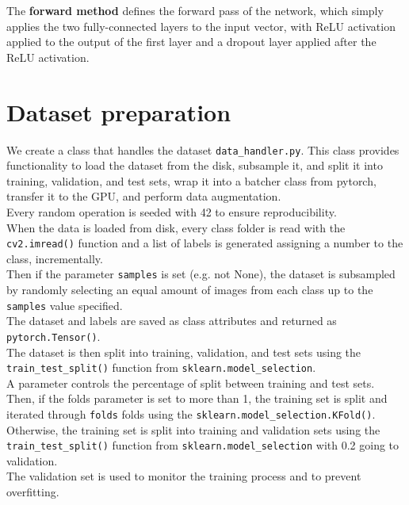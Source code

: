 \documentclass{report}
\begin{document}
    The \textbf{forward method} defines the forward pass of the network, which simply applies the two fully-connected layers to the input vector, with ReLU activation applied to the output of the first layer and a dropout layer applied after the ReLU activation.

\section{Dataset preparation}
We create a class that handles the dataset \texttt{data\_handler.py}. This class provides functionality to load the dataset from the disk, subsample it, and split it 
into training, validation, and test sets, wrap it into a batcher class from pytorch, transfer it to the GPU, and perform data augmentation. \\
Every random operation is seeded with 42 to ensure reproducibility.\\

When the data is loaded from disk, every class folder is read with the \texttt{cv2.imread()} function and a list of labels is generated assigning a number to the class, incrementally. \\
Then if the parameter \texttt{samples} is set (e.g. not None), the dataset is subsampled by randomly selecting an equal amount of images from each class up to the \texttt{samples} value specified. \\

The dataset and labels are saved as class attributes and returned as \texttt{pytorch.Tensor()}.\\

The dataset is then split into training, validation, and test sets using the \texttt{train\_test\_split()} function from \texttt{sklearn.model\_selection}. \\
A parameter controls the percentage of split between training and test sets. \\

Then, if the folds parameter is set to more than 1, the training set is split and iterated through \texttt{folds} folds using the \texttt{sklearn.model\_selection.KFold()}. \\
Otherwise, the training set is split into training and validation sets using the \texttt{train\_test\_split()} function from \texttt{sklearn.model\_selection} with 0.2 going to validation. \\
The validation set is used to monitor the training process and to prevent overfitting. \\
\end{document}
